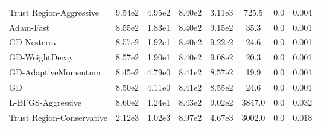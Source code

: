 \documentclass{article}
\begin{document}
\begin{table}[htbp]
{\begin{tabular}{p{2.5cm}*{7}{c}}
Trust Region-Aggressive & 9.54e2 & 4.95e2 & 8.40e2 & 3.11e3 & 725.5 & 0.0 & 0.004 \\
Adam-Fast & 8.55e2 & 1.83e1 & 8.40e2 & 9.15e2 & 35.3 & 0.0 & 0.001 \\
GD-Nesterov & 8.57e2 & 1.92e1 & 8.40e2 & 9.22e2 & 24.6 & 0.0 & 0.001 \\
GD-WeightDecay & 8.57e2 & 1.90e1 & 8.40e2 & 9.08e2 & 20.3 & 0.0 & 0.001 \\
GD-AdaptiveMomentum & 8.45e2 & 4.79e0 & 8.41e2 & 8.57e2 & 19.9 & 0.0 & 0.001 \\
GD & 8.50e2 & 4.11e0 & 8.41e2 & 8.55e2 & 24.6 & 0.0 & 0.001 \\
L-BFGS-Aggressive & 8.60e2 & 1.24e1 & 8.43e2 & 9.02e2 & 3847.0 & 0.0 & 0.032 \\
Trust Region-Conservative & 2.12e3 & 1.02e3 & 8.97e2 & 4.67e3 & 3002.0 & 0.0 & 0.018 \\
\bottomrule
\end{tabular}
}
\end{table}
\end{document}
